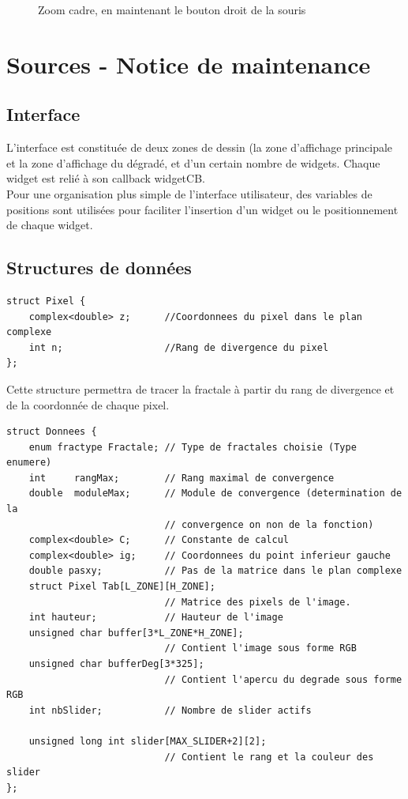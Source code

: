 \documentclass[a4paper,11pt]{article} \usepackage[T1]{fontenc} \usepackage[utf8]{inputenc} \usepackage[francais]{babel}
\begin{document}
\begin{itemize}
\begin{figure}[H]
\begin{center}
            \caption{Zoom cadre, en maintenant le bouton droit de la souris}
        \end{center} \end{figure}

\end{itemize}



\section{Sources - Notice de maintenance}

\subsection{Interface}%
L'interface est constituée de deux zones de dessin (la zone d'affichage principale et la zone d'affichage du dégradé, et d'un certain nombre de widgets. Chaque widget est relié à son callback widgetCB.\\

Pour une organisation plus simple de l'interface utilisateur, des variables de positions sont utilisées pour faciliter l'insertion d'un widget ou le positionnement  de chaque widget.
\subsection{Structures de données}
\begin{lstlisting}
struct Pixel {
    complex<double> z;      //Coordonnees du pixel dans le plan complexe
    int n;                  //Rang de divergence du pixel
};
\end{lstlisting}

Cette structure permettra de tracer la fractale à partir du rang de divergence et de la coordonnée de chaque pixel.

\begin{lstlisting}
struct Donnees {
    enum fractype Fractale; // Type de fractales choisie (Type enumere)
    int     rangMax;        // Rang maximal de convergence
    double  moduleMax;      // Module de convergence (determination de la
                            // convergence on non de la fonction)
    complex<double> C;      // Constante de calcul
    complex<double> ig;     // Coordonnees du point inferieur gauche
    double pasxy;           // Pas de la matrice dans le plan complexe
    struct Pixel Tab[L_ZONE][H_ZONE];
                            // Matrice des pixels de l'image.
    int hauteur;            // Hauteur de l'image
    unsigned char buffer[3*L_ZONE*H_ZONE];
                            // Contient l'image sous forme RGB
    unsigned char bufferDeg[3*325];
                            // Contient l'apercu du degrade sous forme RGB
    int nbSlider;           // Nombre de slider actifs
    
    unsigned long int slider[MAX_SLIDER+2][2];
                            // Contient le rang et la couleur des slider
};

\end{lstlisting}
\end{document}
